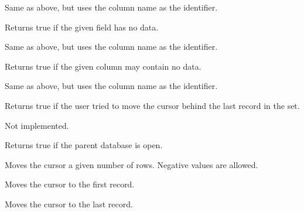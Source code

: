 Same as above, but uses the column name as the identifier.



Returns true if the given field has no data.


Same as above, but uses the column name as the identifier.



Returns true if the given column may contain no data.


Same as above, but uses the column name as the identifier.



Returns true if the user tried to move the cursor behind the last record
in the set.



Not implemented.
  


Returns true if the parent database is open.



Moves the cursor a given number of rows. Negative values are allowed.
  


Moves the cursor to the first record.
  


Moves the cursor to the last record.
  
\label{wxrecordsetmovenext}


